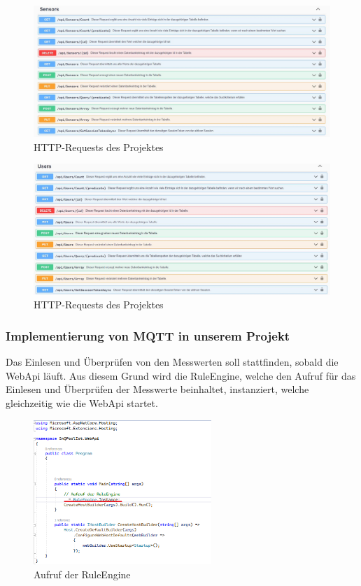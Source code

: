 \begin{figure}[H]
    \centering
    \includegraphics[width=1.6\textwidth]{pics/WebApiRequests8.JPG}
    \caption{HTTP-Requests des Projektes}
\end{figure}

\begin{figure}[H]
    \centering
    \includegraphics[width=1.6\textwidth]{pics/WebApiRequests9.JPG}
    \caption{HTTP-Requests des Projektes}
\end{figure}

\subsubsection{Implementierung von MQTT in unserem Projekt}
Das Einlesen und Überprüfen von den Messwerten soll stattfinden, sobald die WebApi läuft.
Aus diesem Grund wird die RuleEngine, 
welche den Aufruf für das Einlesen und Überprüfen der Messwerte beinhaltet, instanziert, welche gleichzeitig wie die WebApi startet.

\begin{figure}[H]
    \centering
    \includegraphics[width=0.6\textwidth]{pics/RuleEngineCall.png}
    \caption{Aufruf der RuleEngine}
\end{figure}

